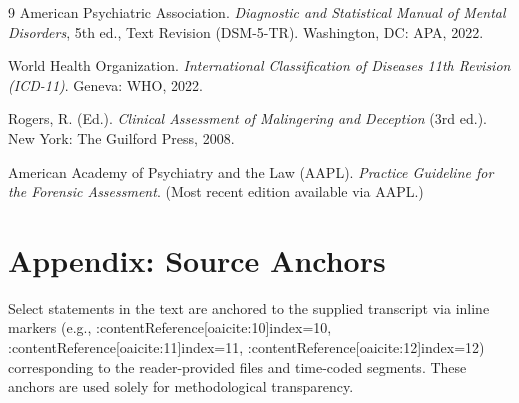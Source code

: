 \documentclass[12pt]{article}
\begin{document}
\begin{thebibliography}{9}
\setlength{\itemsep}{0pt}
American Psychiatric Association. \emph{Diagnostic and Statistical Manual of Mental Disorders}, 5th ed., Text Revision (DSM-5-TR). Washington, DC: APA, 2022.

World Health Organization. \emph{International Classification of Diseases 11th Revision (ICD-11)}. Geneva: WHO, 2022.

Rogers, R. (Ed.). \emph{Clinical Assessment of Malingering and Deception} (3rd ed.). New York: The Guilford Press, 2008.

American Academy of Psychiatry and the Law (AAPL). \emph{Practice Guideline for the Forensic Assessment}. (Most recent edition available via AAPL.)
\end{thebibliography}

\appendix
\section*{Appendix: Source Anchors}
Select statements in the text are anchored to the supplied transcript via inline markers (e.g., :contentReference[oaicite:10]{index=10}, :contentReference[oaicite:11]{index=11}, :contentReference[oaicite:12]{index=12}) corresponding to the reader-provided files and time-coded segments. These anchors are used solely for methodological transparency.
\end{document}
